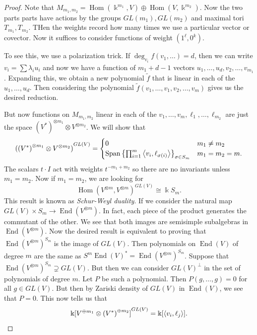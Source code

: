 \documentclass[leqno, openany]{memoir}
\theoremstyle{definition}
\theoremstyle{remark}
\theoremstyle{plain}
\theoremstyle{definition}
\theoremstyle{remark}
\renewcommand{\k}{\Bbbk}
\newcommand{\wtl}[1]{\widetilde{#1}}
\DeclareMathOperator{\Hom}{Hom}
\DeclareMathOperator{\End}{End}
\begin{document}
\begin{proof}
    Note that $M_{m_1, m_2} = \Hom(\k^{m_1}, V) \oplus \Hom(V, \k^{m_2})$. Now the two parts parts have actions by the groups $GL(m_1), GL(m_2)$ and maximal tori $T_{m_1}, T_{m_2}$. THen the weights record how many times we use a particular vector or covector. Now it suffices to consider functions of weight $(1^{\ell}, 0^k)$.

    To see this, we use a polarization trick. If $\deg_{v_i} f(v_1, \ldots) = d$, then we can write $v_i = \sum \lambda_i u_i$ and now we have a function of $m_1 + d-1$ vectors $u_1, \ldots, u_d, v_2, \ldots, v_{m_1}$. Expanding this, we obtain a new polynomial $\wtl{f}$ that is linear in each of the $u_1, \ldots, u_d$. Then considering the polynomial $\wtl{f}(v_1, \ldots, v_1, v_2, \ldots, v_m)$ gives us the desired reduction.

    But now functions on $M_{m_1, m_2}$ linear in each of the $v_1, \ldots, v_m, \ell_1, \ldots, \ell_{m_2}$ are just the space ${(V^*)}^{\otimes m_1} \otimes V^{\otimes m_2}$. We will show that
    \[ {({(V^*)}^{\otimes m_1} \otimes V^{\otimes m_2})}^{GL(V)} = \begin{cases}
        0 & m_1 \neq m_2 \\
        \operatorname{Span} \qty{\prod_{i=1}^m \ev{v_i, \ell_{\sigma(i)}}}_{\sigma \in S_m} & m_1 = m_2 = m.
    \end{cases} \]
    The scalars $t\cdot I$ act with weights $t^{-m_1 + m_2}$ so there are no invariants unless $m_1 = m_2$. Now if $m_1 = m_2$, we are looking for
    \[ {\Hom(V^{\otimes m}, V^{\otimes m})}^{GL(V)} \cong \k S_m. \] 
    This result is known as \textit{Schur-Weyl duality}. If we consider the natural map $GL(V) \times S_m \to \End(V^{\otimes m})$. In fact, each piece of the product generates the commutant of the other. We see that both images are semisimple subalgebras in $\End(V^{\otimes m})$. Now the desired result is equivalent to proving that ${\End(V^{\otimes m})}^{S_m}$ is the image of $GL(V)$. Then polynomials on $\End(V)$ of degree $m$ are the same as $S^m {\End(V)}^* = {\End(V^{\otimes m})}^{S_m}$. Suppose that ${\End(V^{\otimes m})}^{S_m} \supsetneq GL(V)$. But then we can consider ${GL(V)}^{\perp}$ in the set of polynomials of degree $m$. Let $P$ be such a polynomial. Then $P(g, \ldots, g) = 0$ for all $g \in GL(V)$. But then by Zariski density of $GL(V)$ in $\End(V)$, we see that $P = 0$. This now tells us that 
    \[ { \k[V^{\oplus m_1} \otimes {(V^*)}^{\oplus m_2}] }^{GL(V)} = \k[\ev{v_i, \ell_j}]. \]


\end{proof}
\end{document}
